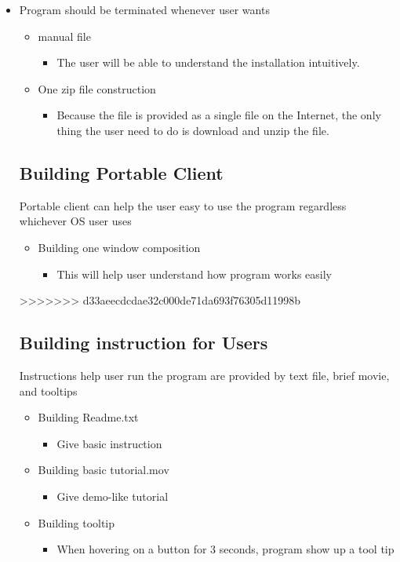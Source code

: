 \documentclass[conference]{IEEEtran}
\begin{document}
\begin{itemize}
  \item Program should be terminated whenever user wants
\begin{itemize}
  \item manual file
  \begin{itemize}
    \item The user will be able to understand the installation intuitively.
  \end{itemize}
  \item One zip file construction
  \begin{itemize}
    \item Because the file is provided as a single file on the Internet, the only thing the user need to do is download and unzip the file.
  \end{itemize}
\end{itemize}
\textit{ }


\subsection{Building Portable Client}
 Portable client can help the user easy to use the program regardless whichever OS user uses

\begin{itemize}
  \item Building one window composition
  \begin{itemize}
    \item This will help user understand how program works easily
  \end{itemize}
\end{itemize}
>>>>>>> d33aeecdcdae32c000de71da693f76305d11998b
\textit{ }


\subsection{Building instruction for Users}
 Instructions help user run the program are provided by text file, brief movie, and tooltips

\begin{itemize}
  \item Building Readme.txt
  \begin{itemize}
    \item Give basic instruction
  \end{itemize}
  \item Building basic tutorial.mov
  \begin{itemize}
    \item Give demo-like tutorial
  \end{itemize}
  \item Building tooltip
  \begin{itemize}
    \item When hovering on a button for 3 seconds, program show up a tool tip
  \end{itemize}
\end{itemize}
\textit{ }



\end{itemize}
\end{document}
